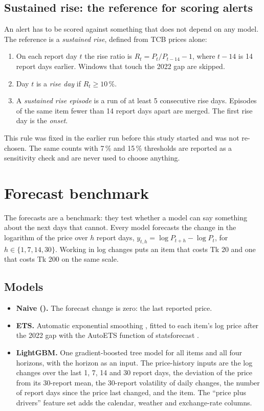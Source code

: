 \subsection{Sustained rise: the reference for scoring alerts}\label{sec:rise}
An alert has to be scored against something that does not depend on any model. The reference is a \emph{sustained rise}, defined from TCB prices alone:
\begin{enumerate}[leftmargin=*,itemsep=2pt]
\item On each report day $t$ the rise ratio is $R_t = P_t / P_{t-14} - 1$, where $t-14$ is 14 report days earlier. Windows that touch the 2022 gap are skipped.
\item Day $t$ is a \emph{rise day} if $R_t \geq 10\,\%$.
\item A \emph{sustained rise episode} is a run of at least 5 consecutive rise days. Episodes of the same item fewer than 14 report days apart are merged. The first rise day is the \emph{onset}.
\end{enumerate}
This rule was fixed in the earlier run before this study started and was not re-chosen. The same counts with 7\,\% and 15\,\% thresholds are reported as a sensitivity check and are never used to choose anything.

\section{Forecast benchmark}\label{sec:method-forecast}
The forecasts are a benchmark: they test whether a model can say something about the next days that \naive{} cannot. Every model forecasts the change in the logarithm of the price over $h$ report days, $y_{t,h} = \log P_{t+h} - \log P_t$, for $h \in \{1, 7, 14, 30\}$. Working in log changes puts an item that costs Tk 20 and one that costs Tk 200 on the same scale.

\subsection{Models}
\begin{itemize}[leftmargin=*,itemsep=2pt]
\item \textbf{Naive (\naive).} The forecast change is zero: the last reported price.
\item \textbf{ETS.} Automatic exponential smoothing \cite{hyndman2002}, fitted to each item's log price after the 2022 gap with the AutoETS function of statsforecast \cite{statsforecast}.
\item \textbf{LightGBM.} One gradient-boosted tree model \cite{lightgbm} for all items and all four horizons, with the horizon as an input. The price-history inputs are the log changes over the last 1, 7, 14 and 30 report days, the deviation of the price from its 30-report mean, the 30-report volatility of daily changes, the number of report days since the price last changed, and the item. The ``price plus drivers'' feature set adds the calendar, weather and exchange-rate columns.
\end{itemize}

